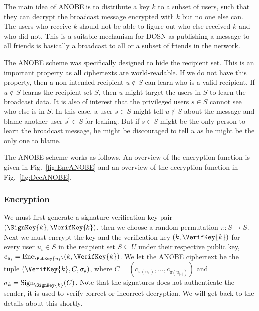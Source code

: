 The main idea of \ac{ANOBE} is to distribute a key \(k\) to a subset of users, 
such that they can decrypt the broadcast message encrypted with \(k\) but no 
one else can.
The users who receive \(k\) should not be able to figure out who else received 
\(k\) and who did not.
This is a suitable mechanism for \ac{DOSN} as publishing a message to all 
friends is basically a broadcast to all or a subset of friends in the network.

The \ac{ANOBE} scheme was specifically designed to hide the recipient set.
This is an important property as all ciphertexts are world-readable.
If we do not have this property, then a non-intended recipient \(u\notin S\) 
can learn who is a valid recipient.
If \(u\notin S\) learns the recipient set \(S\), then \(u\) might target the 
users in \(S\) to learn the broadcast data.
It is also of interest that the privileged users \(s\in S\) cannot see who else 
is in \(S\).
In this case, a user \(s\in S\) might tell \(u\notin S\) about the message and 
blame another user \(s^\prime\in S\) for leaking.
But if \(s\in S\) might be the only person to learn the broadcast message, he 
might be discouraged to tell \(u\) as he might be the only one to blame.

The \ac{ANOBE} scheme works as follows.
An overview of the encryption function is given in Fig.~\ref{fig:EncANOBE} and 
an overview of the decryption function in Fig.~\ref{fig:DecANOBE}.

\subsubsection<article>{Encryption}

We must first generate a signature-verification key-pair \((\SignKey{k}, 
  \VerifKey{k})\), then we choose a random permutation \(\pi\colon S\to S\).
Next we must encrypt the key and the verification key \((k, \VerifKey{k})\) for 
every user \(u_i\in S\) in the recipient set \(S\subseteq U\) under their 
respective public key, \(c_{u_i} = \Enc_{\PubKey{u_i}}(k, \VerifKey{k})\).
We let the \ac{ANOBE} ciphertext be the tuple \((\VerifKey{k}, C, \sigma_k)\), 
where
\(C = ( c_{\pi(u_1)}, \ldots, c_{\pi(u_{|S|})})\) and
\(\sigma_k = \Sign_{\SignKey{k}}( C )\).
Note that the signatures does not authenticate the sender, it is used to verify 
correct or incorrect decryption.
We will get back to the details about this shortly.


